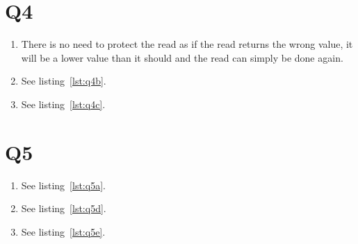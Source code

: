 \documentclass[a4paper]{article}
\begin{document}
\section*{Q4} %
\begin{enumerate}
\item %
There is no need to protect the read as if the read returns the wrong value, it will be a lower value than it should and the read can simply be done again.
\item %
See listing~\ref{lst:q4b}.

\item %
See listing~\ref{lst:q4c}.
\end{enumerate}


\textcolor{red}{

}
\section*{Q5} %
\begin{enumerate}
\item %
See listing~\ref{lst:q5a}.
\setcounter{enumi}{3}
\item %
See listing~\ref{lst:q5d}.
\item %
See listing~\ref{lst:q5e}.
\end{enumerate}


\textcolor{red}{

}
\textcolor{red}{

}
\textcolor{red}{

}
\end{document}
